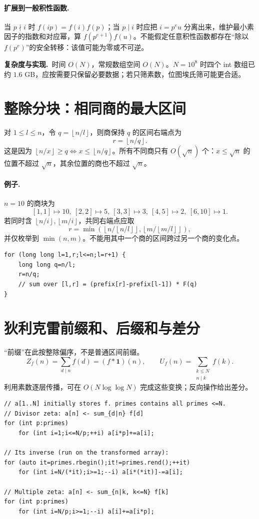 \documentclass[UTF8,a4paper,11pt,oneside,openany,fontset=fandol]{ctexbook}
\theoremstyle{definition}
\newcommand{\one}{\mathbf 1}
\newcommand{\floor}[1]{\left\lfloor #1\right\rfloor}
\newcommand{\cost}{\par\noindent\textbf{复杂度与实现.}\ }
\begin{document}
\paragraph{扩展到一般积性函数.} 当 $p\nmid i$ 时 $f(ip)=f(i)f(p)$；当 $p\mid i$ 时应把 $i=p^e u$ 分离出来，维护最小素因子的指数和对应幂，算 $f(p^{e+1})f(u)$。不能假定任意积性函数都存在“除以 $f(p^e)$”的安全转移：该值可能为零或不可逆。
\cost 时间 $O(N)$，常规数组空间 $O(N)$。$N=10^8$ 时四个 int 数组已约 $1.6$ GB，应按需要只保留必要数据；若只筛素数，位图埃氏筛可能更合适。


\section{整除分块：相同商的最大区间}
对 $1\le l\le n$，令 $q=\floor{n/l}$，则商保持 $q$ 的区间右端点为
\[
 r=\floor{n/q}.
\]
这是因为 $\floor{n/x}\ge q\iff x\le\floor{n/q}$。所有不同商只有 $O(\sqrt n)$ 个：$x\le\sqrt n$ 的位置不超过 $\sqrt n$，其余位置的商也不超过 $\sqrt n$。

\paragraph{例子.} $n=10$ 的商块为
\[
[1,1]\mapsto10,\ [2,2]\mapsto5,\ [3,3]\mapsto3,\ [4,5]\mapsto2,\ [6,10]\mapsto1.
\]
若同时含 $\floor{n/i},\floor{m/i}$，共同右端点应取
\[
 r=\min\left(\floor{n/\floor{n/l}},\floor{m/\floor{m/l}}\right),
\]
并仅枚举到 $\min(n,m)$。不能用其中一个商的区间跨过另一个商的变化点。
\begin{lstlisting}
for (long long l=1,r;l<=n;l=r+1) {
    long long q=n/l;
    r=n/q;
    // sum over [l,r] = (prefix[r]-prefix[l-1]) * F(q)
}
\end{lstlisting}


\section{狄利克雷前缀和、后缀和与差分}
“前缀”在此按整除偏序，不是普通区间前缀。
\[
 Z_f(n)=\sum_{d\mid n}f(d)=(f*\one)(n),\qquad
 U_f(n)=\sum_{\substack{k\le N\\n\mid k}}f(k).
\]
利用素数逐层传播，可在 $O(N\log\log N)$ 完成这些变换；反向操作给出差分。


\begin{lstlisting}
// a[1..N] initially stores f. primes contains all primes <=N.
// Divisor zeta: a[n] <- sum_{d|n} f[d]
for (int p:primes)
    for (int i=1;i<=N/p;++i) a[i*p]+=a[i];

// Its inverse (run on the transformed array):
for (auto it=primes.rbegin();it!=primes.rend();++it)
    for (int i=N/(*it);i>=1;--i) a[i*(*it)]-=a[i];

// Multiple zeta: a[n] <- sum_{n|k, k<=N} f[k]
for (int p:primes)
    for (int i=N/p;i>=1;--i) a[i]+=a[i*p];
\end{lstlisting}
\end{document}
